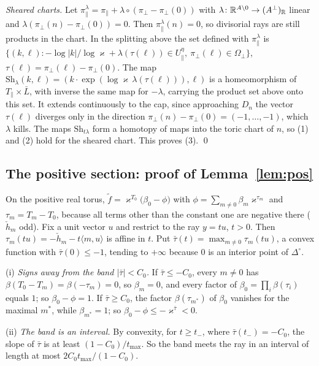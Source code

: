 \emph{Sheared charts.} Let $\pi^\lambda_\parallel=\pi_\parallel+\lambda\circ(\pi_\perp-\pi_\perp(0))$ with $\lambda\colon\mathbb R^{A\setminus0}\to(A^\perp)_\mathbb R$ linear and $\lambda(\pi_\perp(n)-\pi_\perp(0))=0$. Then $\pi^\lambda_\parallel(n)=0$, so divisorial rays are still products in the chart. In the splitting above the set defined with $\pi^\lambda_\parallel$ is $\{(k,\ell):-\log|k|/\log \varkappa+\lambda(\tau(\ell))\in U_\parallel^\eta,\ \pi_\perp(\ell)\in\Omega_\perp\}$, $\tau(\ell)=\pi_\perp(\ell)-\pi_\perp(0)$. The map $\mathrm{Sh}_\lambda(k,\ell)=(k\cdot\exp(\log \varkappa\,\lambda(\tau(\ell))),\ell)$ is a homeomorphism of $T_\parallel\times\bar L$, with inverse the same map for $-\lambda$, carrying the product set above onto this set. It extends continuously to the cap, since approaching $D_n$ the vector $\tau(\ell)$ diverges only in the direction $\pi_\perp(n)-\pi_\perp(0)=(-1,\dots,-1)$, which $\lambda$ kills. The maps $\mathrm{Sh}_{t\lambda}$ form a homotopy of maps into the toric chart of $n$, so (1) and (2) hold for the sheared chart. This proves (3). \qed

\subsection{The positive section: proof of Lemma~\ref{lem:pos}}\label{app:pos}
On the positive real torus, $\tilde f=\varkappa^{T_0}\bigl(\beta_0-\phi\bigr)$ with $\phi=\sum_{m\neq0}\beta_m\varkappa^{\tau_m}$ and $\tau_m=T_m-T_0$, because all terms other than the constant one are negative there ($\check h_m$ odd). Fix a unit vector $u$ and restrict to the ray $y=tu$, $t>0$. Then $\tau_m(tu)=-\check h_m-t\langle m,u\rangle$ is affine in $t$. Put $\bar\tau(t)=\max_{m\ne0}\tau_m(tu)$, a convex function with $\bar\tau(0)\le-1$, tending to $+\infty$ because $0$ is an interior point of $\Delta^\circ$.

(i) \emph{Signs away from the band $|\bar\tau|<C_0$.} If $\bar\tau\le-C_0$, every $m\neq0$ has $\beta(T_0-T_m)=\beta(-\tau_m)=0$, so $\beta_m=0$, and every factor of $\beta_0=\prod_i\beta(\tau_i)$ equals $1$; so $\beta_0-\phi=1$. If $\bar\tau\ge C_0$, the factor $\beta(\tau_{m^*})$ of $\beta_0$ vanishes for the maximal $m^*$, while $\beta_{m^*}=1$; so $\beta_0-\phi\le-\varkappa^{\bar\tau}<0$.

(ii) \emph{The band is an interval.} By convexity, for $t\ge t_-$, where $\bar\tau(t_-)=-C_0$, the slope of $\bar\tau$ is at least $(1-C_0)/t_{\max}$. So the band meets the ray in an interval of length at most $2C_0t_{\max}/(1-C_0)$.

